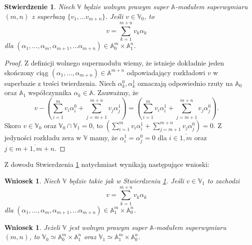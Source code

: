 \documentclass[11pt,a4paper]{report}
\newtheorem{corollary}[theorem]{Wniosek}
\newtheorem{proposition}[theorem]{Stwierdzenie}
\theoremstyle{definition}
\begin{document}
\begin{proposition}
Niech $\mathbb{V}$ będzie wolnym prawym super $\mathbb{A}$-modułem superwymiaru $(m,n)$ z superbazą $\{ v_1, \ldots v_{m+n} \}$. Jeśli $v \in \mathbb{V}_0$, to
\begin{equation*}
  v = \sum_{k=1}^{m+n}  v_k \alpha_k
\end{equation*}
dla $(\alpha_1, \ldots, \alpha_m, \alpha_{m+1}, \ldots \alpha_{m+n}) \in \mathbb{A}_0^m \times \mathbb{A}_1^n$.
\label{hom_coeff}
\end{proposition}
\begin{proof}
Z definicji wolnego supermodułu wiemy, że istnieje dokładnie jeden skończony ciąg $(\alpha_1, \ldots, \alpha_{m+n}) \in \mathbb{A}^{m+n}$ odpowiadający rozkładowi $v$ w superbazie z treści twierdzenia. Niech $\alpha^0_k, \alpha^1_k$ oznaczają odpowiednio rzuty na $\mathbb{A}_0$ oraz $\mathbb{A}_1$ współczynnika $\alpha_k \in \mathbb{A}$. Zauważmy, że
\begin{equation}
\label{free_module_decomposition}
v - \left( \sum_{i=1}^m v_i \alpha_i^0 + \sum_{j=m+1}^{m+n} v_j \alpha_j^1 \right) = \left( \sum_{i=1}^m v_i \alpha_i^1 + \sum_{j=m+1}^{m+n} v_j \alpha_j^0 \right).
\end{equation}
Skoro $v \in \mathbb{V}_0$ oraz $\mathbb{V}_0 \cap \mathbb{V}_1 = {0}$, to $\left( \sum_{i=1}^m v_i \alpha_i^1 + \sum_{j=m+1}^{m+n} v_j \alpha_j^0 \right) = 0$. Z jedyności rozkładu zera w $\mathbb{V}$ mamy, że $\alpha^1_i = \alpha^0_j = 0$ dla $i \in \overline{1,m}$ oraz $j \in \overline{m+1,m+n}.$
\end{proof}

Z dowodu Stwierdzenia \ref{hom_coeff} natychmiast wynikają następujące wnioski:

\begin{corollary}
\label{hom_coeff2}
Niech $\mathbb{V}$ będzie takie jak w Stwierdzeniu \ref{hom_coeff}. Jeśli $v \in \mathbb{V}_1$ to zachodzi
\begin{equation*}
  v = \sum_{k=1}^{m+n} v_k \alpha_k
\end{equation*}
dla $(\alpha_1, \ldots, \alpha_m, \alpha_{m+1}, \ldots \alpha_{m+n}) \in \mathbb{A}_1^m \times \mathbb{A}_0^n$.
\end{corollary}

\begin{corollary}
\label{amodule_structure}
Jeżeli $\mathbb{V}$ jest wolnym prawym super $\mathbb{A}$-modułem superwymiaru $(m,n)$, to $\mathbb{V}_0 \simeq \mathbb{A}_0^m \times \mathbb{A}_1^n$ oraz $\mathbb{V}_1 \simeq \mathbb{A}_1^m \times \mathbb{A}_0^n$. 
\end{corollary}
\end{document}
